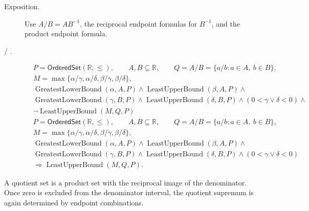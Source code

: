 \begin{remark*}
\begin{description}
  \item[Exposition.]
Use $A/B=A B^{-1}$, the reciprocal endpoint formulas for $B^{-1}$, and the
product endpoint formula.


  \item[ / .]

\[
\begin{aligned}
&P=\mathsf{OrderedSet}(\mathbb{R},\leq),\qquad
A,B\subseteq\mathbb{R},\qquad Q=A/B=\{a/b:a\in A,\ b\in B\},\\
&M=\max\{\alpha/\gamma,\alpha/\delta,\beta/\gamma,\beta/\delta\},\\
&\operatorname{GreatestLowerBound}(\alpha,A,P)\land
\operatorname{LeastUpperBound}(\beta,A,P)\land\\
&\operatorname{GreatestLowerBound}(\gamma,B,P)\land
\operatorname{LeastUpperBound}(\delta,B,P)\land
(0<\gamma\lor\delta<0)\land\\
&\neg\operatorname{LeastUpperBound}(M,Q,P)
\end{aligned}
\]
\[
\begin{aligned}
&P=\mathsf{OrderedSet}(\mathbb{R},\leq),\qquad
A,B\subseteq\mathbb{R},\qquad Q=A/B=\{a/b:a\in A,\ b\in B\},\\
&M=\max\{\alpha/\gamma,\alpha/\delta,\beta/\gamma,\beta/\delta\},\\
&\operatorname{GreatestLowerBound}(\alpha,A,P)\land
\operatorname{LeastUpperBound}(\beta,A,P)\land\\
&\operatorname{GreatestLowerBound}(\gamma,B,P)\land
\operatorname{LeastUpperBound}(\delta,B,P)\land
(0<\gamma\lor\delta<0)\\
&\Longrightarrow \operatorname{LeastUpperBound}(M,Q,P).
\end{aligned}
\]
\end{description}
\end{remark*}

\begin{remark*}[Interpretation]
A quotient set is a product set with the reciprocal image of the denominator.
Once zero is excluded from the denominator interval, the quotient supremum is
again determined by endpoint combinations.
\end{remark*}

